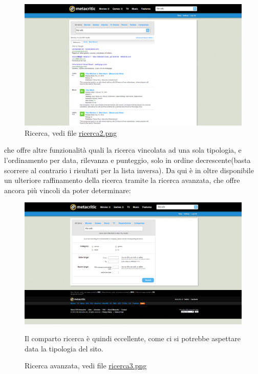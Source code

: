 \documentclass[12pt]{article}
\begin{document}
\begin{figure}[H]
	\begin{center}
		\includegraphics[width=13.5cm]{ricerca2.png}
		\caption{Ricerca, vedi file \href{ricerca2.png}{ricerca2.png}}
	\end{center}
\end{figure}
che offre altre funzionalità quali la ricerca vincolata ad una sola tipologia, e l'ordinamento per data, rilevanza e punteggio, solo in ordine decrescente(basta scorrere al contrario i risultati per la lista inversa).
Da qui è in oltre disponibile un ulteriore raffinamento della ricerca tramite la ricerca avanzata, che offre ancora più vincoli da poter determinare:
\begin{figure}[H]
\begin{center}
	\includegraphics[width=13.5cm]{ricerca3.png}
	\caption{Ricerca avanzata, vedi file \href{ricerca3.png}{ricerca3.png}}
\end{center}
Il comparto ricerca è quindi eccellente, come ci si potrebbe aspettare data la tipologia del sito.
\end{figure}
\newpage
\end{document}

